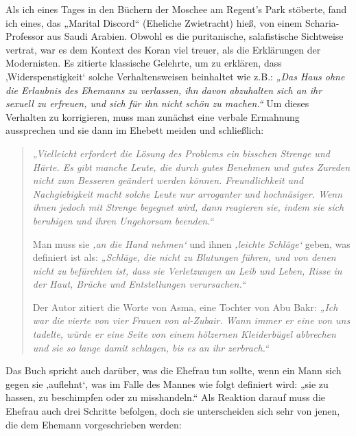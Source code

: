 \documentclass[12pt]{memoir}
\def\–{\hskip0pt-\hskip0pt}
\begin{document}
Als ich eines Tages in den Büchern der Moschee am Regent’s Park stöberte,
fand ich eines, das „Marital Discord“ (Eheliche Zwietracht) hieß,
von einem Scharia\–Professor aus Saudi Arabien.
Obwohl es die puritanische, salafistische Sichtweise vertrat,
war es dem Kontext des Koran viel treuer,
als die Erklärungen der Modernisten.
Es zitierte klassische Gelehrte, um zu erklären,
dass ‚Widerspenstigkeit‘ solche Verhaltensweisen beinhaltet wie z.B.:
\emph{„Das Haus ohne die Erlaubnis des Ehemanns zu verlassen,
ihn davon abzuhalten sich an ihr sexuell zu erfreuen,
und sich für ihn nicht schön zu machen.“}
Um dieses Verhalten zu korrigieren,
muss man zunächst eine verbale Ermahnung aussprechen
und sie dann im Ehebett meiden und schließlich:

\begin{quote}
\emph{%
„Vielleicht erfordert die Lösung des Problems ein bisschen Strenge und Härte.
Es gibt manche Leute, die durch gutes Benehmen und gutes Zureden
nicht zum Besseren geändert werden können.
Freundlichkeit und Nachgiebigkeit macht solche Leute
nur arroganter und hochnäsiger.
Wenn ihnen jedoch mit Strenge begegnet wird,
dann reagieren sie, indem sie sich beruhigen und ihren Ungehorsam beenden.“}

Man muss sie \emph{‚an die Hand nehmen‘}
und ihnen \emph{‚leichte Schläge‘} geben,
was definiert ist als:
\emph{„Schläge, die nicht zu Blutungen führen,
und von denen nicht zu befürchten ist,
dass sie Verletzungen an Leib und Leben,
Risse in der Haut, Brüche und Entstellungen verursachen.“}

Der Autor zitiert die Worte von Asma, eine Tochter von Abu Bakr:
\emph{„Ich war die vierte von vier Frauen von al\–Zubair.
Wann immer er eine von uns tadelte,
würde er eine Seite von einem hölzernen Kleiderbügel abbrechen
und sie so lange damit schlagen, bis es an ihr zerbrach.“}
\end{quote}

Das Buch spricht auch darüber, was die Ehefrau tun sollte,
wenn ein Mann sich gegen sie ‚auflehnt‘,
was im Falle des Mannes wie folgt definiert wird: „sie zu hassen,
zu beschimpfen oder zu misshandeln.“
Als Reaktion darauf muss die Ehefrau auch drei Schritte befolgen,
doch sie unterscheiden sich sehr von jenen,
die dem Ehemann vorgeschrieben werden:
\end{document}
